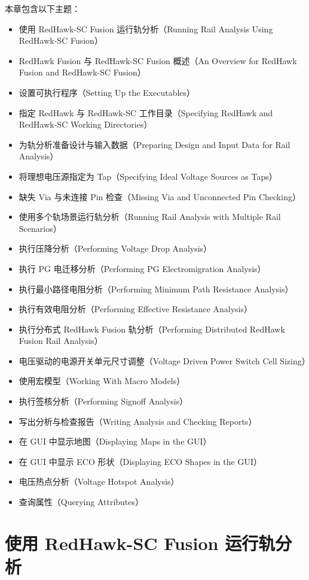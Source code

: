 本章包含以下主题：
\begin{itemize}
  \item 使用 RedHawk-SC Fusion 运行轨分析（Running Rail Analysis Using RedHawk-SC Fusion）
  \item RedHawk Fusion 与 RedHawk-SC Fusion 概述（An Overview for RedHawk Fusion and RedHawk-SC Fusion）
  \item 设置可执行程序（Setting Up the Executables）
  \item 指定 RedHawk 与 RedHawk-SC 工作目录（Specifying RedHawk and RedHawk-SC Working Directories）
  \item 为轨分析准备设计与输入数据（Preparing Design and Input Data for Rail Analysis）
  \item 将理想电压源指定为 Tap（Specifying Ideal Voltage Sources as Taps）
  \item 缺失 Via 与未连接 Pin 检查（Missing Via and Unconnected Pin Checking）
  \item 使用多个轨场景运行轨分析（Running Rail Analysis with Multiple Rail Scenarios）
  \item 执行压降分析（Performing Voltage Drop Analysis）
  \item 执行 PG 电迁移分析（Performing PG Electromigration Analysis）
  \item 执行最小路径电阻分析（Performing Minimum Path Resistance Analysis）
  \item 执行有效电阻分析（Performing Effective Resistance Analysis）
  \item 执行分布式 RedHawk Fusion 轨分析（Performing Distributed RedHawk Fusion Rail Analysis）
  \item 电压驱动的电源开关单元尺寸调整（Voltage Driven Power Switch Cell Sizing）
  \item 使用宏模型（Working With Macro Models）
  \item 执行签核分析（Performing Signoff Analysis）
  \item 写出分析与检查报告（Writing Analysis and Checking Reports）
  \item 在 GUI 中显示地图（Displaying Maps in the GUI）
  \item 在 GUI 中显示 ECO 形状（Displaying ECO Shapes in the GUI）
  \item 电压热点分析（Voltage Hotspot Analysis）
  \item 查询属性（Querying Attributes）
\end{itemize}

\section{使用 RedHawk-SC Fusion 运行轨分析}

